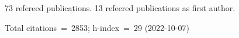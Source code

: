 73 refereed publications. 13 refeered publications as first author.

Total citations~=~2853; h-index~=~29 (2022-10-07)